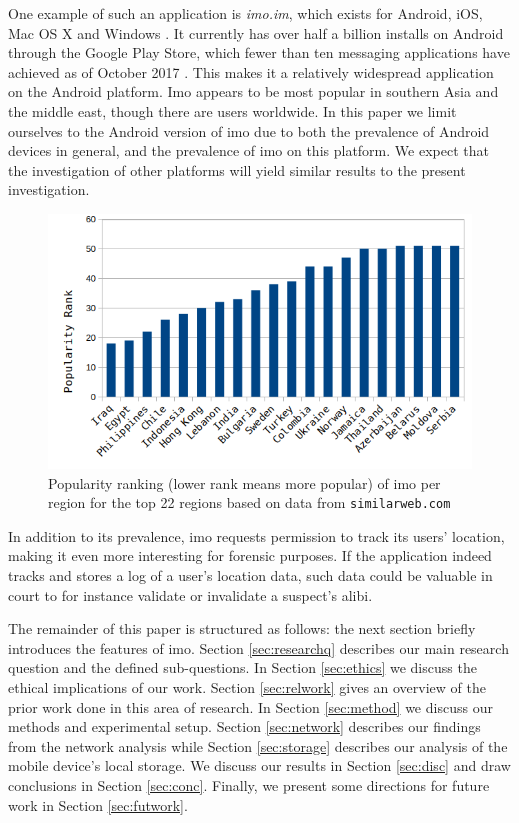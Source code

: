 \documentclass[conference]{IEEEtran}
\begin{document}
One example of such an application is {\it imo.im}, which exists for Android,
iOS, Mac OS X and Windows \cite{imo}. It currently has over half a billion
installs on Android through the Google Play Store, which fewer than ten
messaging applications have achieved as of October 2017
\cite{wiki-gplay-popular}. This makes it a relatively widespread application on
the Android platform. Imo appears to be most popular in southern Asia and the
middle east, though there are users worldwide. In this paper we
limit ourselves to the Android version of imo due to both the prevalence of
Android devices in general, and the prevalence of imo on this platform. We
expect that the investigation of other platforms will yield similar results to
the present investigation.

\begin{figure}
	\includegraphics[width=\linewidth]{pop.png}
	\caption{Popularity ranking (lower rank means more popular) of imo per region for the top 22 regions based on data from \texttt{similarweb.com}}
	\label{fig:pop}
\end{figure}

In addition to its prevalence, imo requests permission to track its users'
location, making it even more interesting for forensic purposes. If the
application indeed tracks and stores a log of a user's location data, such data
could be valuable in court to for instance validate or invalidate a suspect's
alibi.

The remainder of this paper is structured as follows: the next section briefly
introduces the features of imo. Section \ref{sec:researchq} describes our main
research question and the defined sub-questions. In Section \ref{sec:ethics} we
discuss the ethical implications of our work. Section \ref{sec:relwork} gives
an overview of the prior work done in this area of research. In Section
\ref{sec:method} we discuss our methods and experimental setup. Section
\ref{sec:network} describes our findings from the network analysis while
Section \ref{sec:storage} describes our analysis of the mobile device's local
storage. We discuss our results in Section \ref{sec:disc} and draw conclusions
in Section \ref{sec:conc}. Finally, we present some directions for future work
in Section \ref{sec:futwork}.
\end{document}
